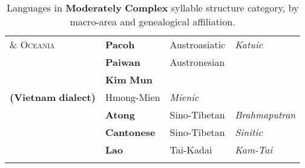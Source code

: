 \begin{table}
\begin{tabularx}{\textwidth}{XXXX}
\textsc{\&} \textsc{Oceania} & \textbf{Pacoh} & Austroasiatic & \textit{Katuic}\\
\hhline{-~~~} & \textbf{Paiwan} & Austronesian & \\
& \textbf{Kim} \textbf{Mun} \\
\textbf{(Vietnam} \textbf{dialect)} & Hmong-Mien & \textit{Mienic}\\
& \textbf{Atong} & Sino-Tibetan & \textit{Brahmaputran}\\
& \textbf{Cantonese} & Sino-Tibetan & \textit{Sinitic}\\
& \textbf{Lao} & Tai-Kadai & \textit{Kam-Tai}\\
\hhline{~---}
\lspbottomrule
\end{tabularx}
\caption{\label{tab:key:2.5.} Languages in \textbf{Moderately} \textbf{Complex} syllable structure category, by macro-area and genealogical affiliation.}
\end{table}




